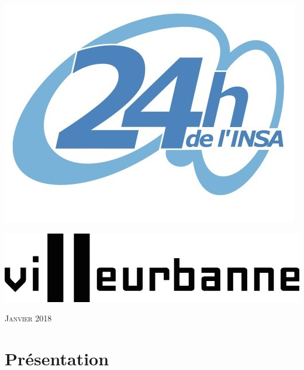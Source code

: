 \documentclass[hidelinks, paper=a4, fontsize=13pt]{report}
\begin{document}
   \begin{minipage}[c]{.46\linewidth}
\includegraphics[scale=1]{Annexes/Images/logo24h.jpg}\\
   \end{minipage} \hfill
   \begin{minipage}[c]{.46\linewidth}
\includegraphics[scale=1]{Annexes/Images/villeurnoir}\\
   \end{minipage}
\begin{flushright}
\vspace{15mm}

{\large\textsc{Janvier 2018}}
\vspace{15mm}


\end{flushright}

\newpage


\chapter{Présentation}
\end{document}
